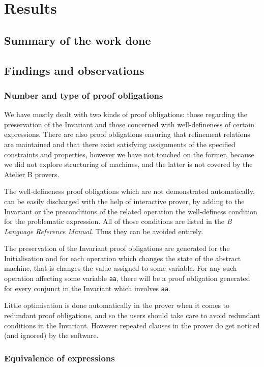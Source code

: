 \documentclass[11pt,journal]{IEEEtran}
\begin{document}
	\section{Results}
	\subsection{Summary of the work done}
	
	
	\subsection{Findings and observations}
	\subsubsection{Number and type of proof obligations}
	We have mostly dealt with two kinds of proof obligations: those regarding the preservation of the Invariant and those concerned with well-defineness of certain expressions. There are also proof obligations ensuring that refinement relations are maintained and that there exist satisfying assignments of the specified constraints and properties\cite{Sekerinski}, however we have not touched on the former, because we did not explore structuring of machines, and the latter is not covered by the Atelier B provers.
	
	The well-defineness proof obligations which are not demonstrated automatically, can be easily discharged with the help of interactive prover, by adding to the Invariant or the preconditions of the related operation the well-definess condition for the problematic expression. All of those conditions are listed in the \emph{B Language Reference Manual}. Thus they can be avoided entirely.
	
	The preservation of the Invariant proof obligations are generated for the Initialisation and for each operation which changes the state of the abstract machine, that is changes the value assigned to some variable. For any such operation affecting some variable \texttt{aa}, there will be a proof obligation generated for every conjunct in the Invariant which involves \texttt{aa}. 
	
	Little optimisation is done automatically in the prover when it comes to redundant proof obligations, and so the users should take care to avoid redundant conditions in the Invariant. However repeated clauses in the prover do get noticed (and ignored) by the software.
	
	\subsubsection{Equivalence of expressions}
	
\end{document}
